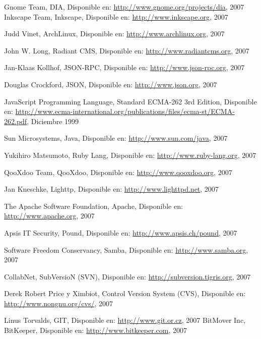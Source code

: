 \begin{thebibliography}{99}

 Gnome Team, DIA, Disponible en: \url{http://www.gnome.org/projects/dia}, 2007
 Inkscape Team, Inkscape, Disponible en:
	\url{http://www.inkscape.org}, 2007

 Judd Vinet, ArchLinux, Disponible en:
	\url{http://www.archlinux.org}, 2007

 John W. Long, Radiant CMS, Disponible en:
	\url{http://www.radiantcms.org}, 2007

 Jan-Klaas Kollhof, JSON-RPC, Disponible en:
	\url{http://www.json-rpc.org}, 2007

Douglas Crockford, JSON, Disponible en:
	\url{http://www.json.org}, 2007

 JavaScript Programming Language, Standard ECMA-262 3rd Edition, Disponible en:
	\url{http://www.ecma-international.org/publications/files/ecma-st/ECMA-262.pdf}, Diciembre 1999

 Sun Microsystems, Java, Disponible en:
	\url{http://www.sun.com/java}, 2007

 Yukihiro Matsumoto, Ruby Lang, Disponible en:
	\url{http://www.ruby-lang.org}, 2007

 QooXdoo Team, QooXdoo, Disponible en:	
	\url{http://www.qooxdoo.org}, 2007

 Jan Kneschke, Lighttp, Disponible en:
	\url{http://www.lighttpd.net}, 2007
	
 The Apache Software Foundation, Apache, Disponible en:
	\url{http://www.apache.org}, 2007

 Apsis IT Security, Pound, Disponible en:
	\url{http://www.apsis.ch/pound}, 2007

 Software Freedom Conservancy, Samba, Disponible en:
	\url{http://www.samba.org}, 2007

 CollabNet, SubVersioN (SVN), Disponible en:
	\url{http://subversion.tigris.org}, 2007

 Derek Robert Price y Ximbiot, Control Version System (CVS), Disponible en:
	\url{http://www.nongnu.org/cvs/}, 2007

 Linus Torvalds, GIT, Disponible en:
	\url{http://www.git.or.cz}, 2007
 BitMover Inc, BitKeeper, Disponible en:
	\url{http://www.bitkeeper.com}, 2007


\end{thebibliography}
